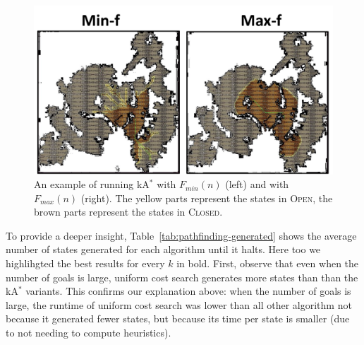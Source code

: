 \documentclass{aicom2e}
\newcommand{\kastar}{kA$^*$}
\newcommand{\minf}{$F_{min}(n)$}
\newcommand{\maxf}{$F_{max}(n)$}
\newcommand{\open}{\textsc{Open}}
\newcommand{\closed}{\textsc{Closed}}
\begin{document}

\begin{figure}
    \includegraphics[width=\columnwidth]{min-vs-max}
    \caption{An example of running \kastar{} with \minf{} (left) and with \maxf{} (right). The yellow parts represent the states in \open{}, the brown parts represent the states in \closed{}.}
    \label{fig:min-vs-max}
\end{figure}

To provide a deeper insight, Table~\ref{tab:pathfinding-generated} shows the average number of states generated for each algorithm until it halts. Here too we highlihgted the best results for every $k$ in bold.
First, observe that even when the number of goals is large, uniform cost search generates more states than than the \kastar{} variants. This confirms our explanation above: when the number of goals is large, the  runtime of uniform cost search was lower than all other algorithm not because it generated fewer states, but because its time per state is smaller (due to not needing to compute heuristics).
\end{document}
